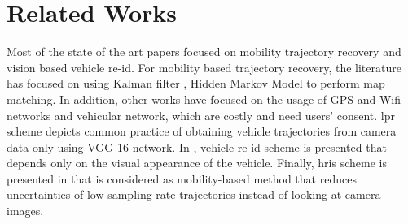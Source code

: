 \section{Related Works} 
\label{sec:related-work}

Most of the state of the art papers focused on mobility trajectory recovery and vision based vehicle \ac{re-id}.
For mobility based trajectory recovery, the literature has focused on using Kalman filter \cite{el2005road}, Hidden Markov Model \cite{newson2009hidden} to perform map matching.
In addition, other works have focused on the usage of GPS \cite{hassanieh2012faster} and Wifi networks \cite{liu2012push, qi2017vehicle} and vehicular network, which are costly and need users' consent.
\ac{lpr} \cite{simonyan2014very} scheme depicts common practice of obtaining vehicle trajectories from camera data only using VGG-16 network.
In \cite{liu2017provid}, vehicle \ac{re-id} scheme is presented that depends only on the visual appearance of the vehicle.
Finally, \ac{hris} scheme is presented in \cite{zheng2012reducing} that is considered as mobility-based method that reduces uncertainties of low-sampling-rate trajectories instead of looking at camera images.

